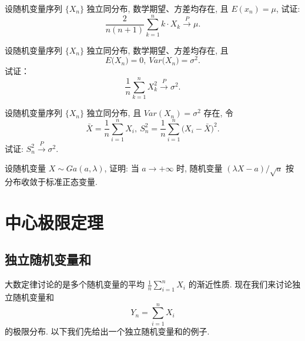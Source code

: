 \begin{xiti}
    \item 设随机变量序列 $ \{ X_n \} $ 独立同分布, 数学期望、方差均存在, 且 $ E ( x_n ) = \mu $, 试证:
    \begin{equation*}
        \frac{2}{n ( n + 1 )} \sum_{k = 1}^n k \cdot X_k \stackrel{P}{\to} \mu.
    \end{equation*}
    \item 设随机变量序列 $ \{ X_n \} $ 独立同分布, 数学期望、方差均存在, 且
    \begin{equation*}
        E \bigl( X_n \bigr) = 0, \ Var \bigl( X_n \bigr) = \sigma^2.
    \end{equation*}
    试证：
    \begin{equation*}
        \frac{1}{n} \sum_{k = 1}^n X_k^2 \stackrel{P}{\to} \sigma^2.
    \end{equation*}
    \item 设随机变量序列 $ \{ X_n \} $ 独立同分布, 且 $ Var (X_n) = \sigma^2 $ 存在, 令
    \begin{equation*}
        \bar{X} = \frac{1}{n} \sum_{i=1}^n X_i, \ S_n^2 = \frac{1}{n} \sum_{i=1}^n \bigl( X_i - \bar{X} \bigr)^2.
    \end{equation*}
    试证: $ S_n^2 \stackrel{P}{\to} \sigma^2 $.
    \item 设随机变量 $ X \sim Ga ( a, \lambda ) $, 证明: 当 $ a \to +\infty $ 时, 随机变量 $ ( \lambda X - a )/\sqrt{a} $ 按分布收敛于标准正态变量.
\end{xiti}


\section{中心极限定理}

\subsection{独立随机变量和}

大数定律讨论的是多个随机变量的平均 $ \frac{1}{n} \sum_{i=1}^n X_i $ 的渐近性质.
现在我们来讨论独立随机变量和
\begin{equation*}
    Y_n = \sum_{i=1}^n X_i
\end{equation*}
的极限分布.
以下我们先给出一个独立随机变量和的例子.


